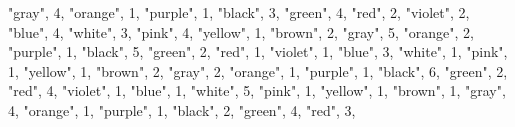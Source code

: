 \documentclass[
]{article}
\newenvironment{Shaded}{\begin{snugshade}}{\end{snugshade}}
\newcommand{\DecValTok}[1]{\textcolor[rgb]{0.00,0.00,0.81}{#1}}
\newcommand{\NormalTok}[1]{#1}
\newcommand{\StringTok}[1]{\textcolor[rgb]{0.31,0.60,0.02}{#1}}
\begin{document}
\begin{Shaded}
\begin{Highlighting}[]
  \StringTok{"gray"}\NormalTok{, }\DecValTok{4}\NormalTok{,}
  \StringTok{"orange"}\NormalTok{, }\DecValTok{1}\NormalTok{,}
  \StringTok{"purple"}\NormalTok{, }\DecValTok{1}\NormalTok{,}
    \StringTok{"black"}\NormalTok{, }\DecValTok{3}\NormalTok{,}
  \StringTok{"green"}\NormalTok{, }\DecValTok{4}\NormalTok{,}
  \StringTok{"red"}\NormalTok{, }\DecValTok{2}\NormalTok{,}
  \StringTok{"violet"}\NormalTok{, }\DecValTok{2}\NormalTok{,}
  \StringTok{"blue"}\NormalTok{, }\DecValTok{4}\NormalTok{,}
  \StringTok{"white"}\NormalTok{, }\DecValTok{3}\NormalTok{,}
  \StringTok{"pink"}\NormalTok{, }\DecValTok{4}\NormalTok{,}
  \StringTok{"yellow"}\NormalTok{, }\DecValTok{1}\NormalTok{,}
  \StringTok{"brown"}\NormalTok{, }\DecValTok{2}\NormalTok{,}
  \StringTok{"gray"}\NormalTok{, }\DecValTok{5}\NormalTok{,}
  \StringTok{"orange"}\NormalTok{, }\DecValTok{2}\NormalTok{,}
  \StringTok{"purple"}\NormalTok{, }\DecValTok{1}\NormalTok{,}
    \StringTok{"black"}\NormalTok{, }\DecValTok{5}\NormalTok{,}
  \StringTok{"green"}\NormalTok{, }\DecValTok{2}\NormalTok{,}
  \StringTok{"red"}\NormalTok{, }\DecValTok{1}\NormalTok{,}
  \StringTok{"violet"}\NormalTok{, }\DecValTok{1}\NormalTok{,}
  \StringTok{"blue"}\NormalTok{, }\DecValTok{3}\NormalTok{,}
  \StringTok{"white"}\NormalTok{, }\DecValTok{1}\NormalTok{,}
  \StringTok{"pink"}\NormalTok{, }\DecValTok{1}\NormalTok{,}
  \StringTok{"yellow"}\NormalTok{, }\DecValTok{1}\NormalTok{,}
  \StringTok{"brown"}\NormalTok{, }\DecValTok{2}\NormalTok{,}
  \StringTok{"gray"}\NormalTok{, }\DecValTok{2}\NormalTok{,}
  \StringTok{"orange"}\NormalTok{, }\DecValTok{1}\NormalTok{,}
  \StringTok{"purple"}\NormalTok{, }\DecValTok{1}\NormalTok{,}
    \StringTok{"black"}\NormalTok{, }\DecValTok{6}\NormalTok{,}
  \StringTok{"green"}\NormalTok{, }\DecValTok{2}\NormalTok{,}
  \StringTok{"red"}\NormalTok{, }\DecValTok{4}\NormalTok{,}
  \StringTok{"violet"}\NormalTok{, }\DecValTok{1}\NormalTok{,}
  \StringTok{"blue"}\NormalTok{, }\DecValTok{1}\NormalTok{,}
  \StringTok{"white"}\NormalTok{, }\DecValTok{5}\NormalTok{,}
  \StringTok{"pink"}\NormalTok{, }\DecValTok{1}\NormalTok{,}
  \StringTok{"yellow"}\NormalTok{, }\DecValTok{1}\NormalTok{,}
  \StringTok{"brown"}\NormalTok{, }\DecValTok{1}\NormalTok{,}
  \StringTok{"gray"}\NormalTok{, }\DecValTok{4}\NormalTok{,}
  \StringTok{"orange"}\NormalTok{, }\DecValTok{1}\NormalTok{,}
  \StringTok{"purple"}\NormalTok{, }\DecValTok{1}\NormalTok{,}
    \StringTok{"black"}\NormalTok{, }\DecValTok{2}\NormalTok{,}
  \StringTok{"green"}\NormalTok{, }\DecValTok{4}\NormalTok{,}
  \StringTok{"red"}\NormalTok{, }\DecValTok{3}\NormalTok{,}

\end{Highlighting}
\end{Shaded}
\end{document}
